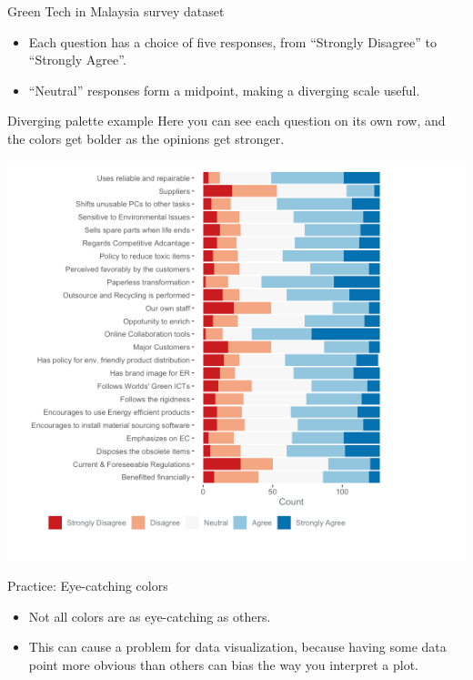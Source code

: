 \documentclass[
  ignorenonframetext,
]{beamer}
\begin{document}
\begin{frame}{Green Tech in Malaysia survey dataset}
\label{green-tech-in-malaysia-survey-dataset-1}
\begin{itemize}
\item
  Each question has a choice of five responses, from ``Strongly
  Disagree'' to ``Strongly Agree''.
\item
  ``Neutral'' responses form a midpoint, making a diverging scale
  useful.
\end{itemize}
\end{frame}

\begin{frame}{Diverging palette example}
\label{diverging-palette-example}
Here you can see each question on its own row, and the colors get bolder
as the opinions get stronger.

\includegraphics{../images/im87.png}
\end{frame}

\begin{frame}{Practice: Eye-catching colors}
\label{practice-eye-catching-colors}
\begin{itemize}
\item
  Not all colors are as eye-catching as others.
\item
  This can cause a problem for data visualization, because having some
  data point more obvious than others can bias the way you interpret a
  plot.
\end{itemize}
\end{frame}
\end{document}
